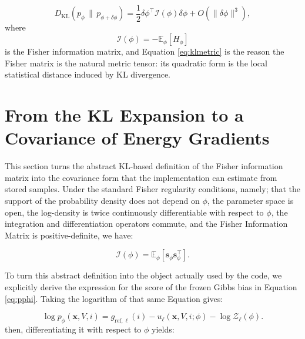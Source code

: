 \begin{equation}
    D_{\mathrm{KL}}
    \left(
        p_\phi
        \,\|\, 
        p_{\phi + \delta \phi}
    \right)
    =
    \frac{1}{2}
    \delta \phi^\top
    \mathcal{I}(\phi)
    \delta \phi
    +
    O(\|\delta \phi\|^3),
    \label{eq:klmetric}
\end{equation}
%
where
%
\begin{equation}
    \mathcal{I}(\phi)
    =
    -
    \mathbb{E}_\phi[H_\phi]
    \label{eq:fimhessian}
\end{equation}
%
is the Fisher information matrix, and Equation \eqref{eq:klmetric} is the reason the Fisher matrix is the natural metric tensor: its quadratic form is the local statistical distance induced by KL divergence.

\section{From the KL Expansion to a Covariance of Energy Gradients}

This section turns the abstract KL-based definition of the Fisher information matrix into the covariance form that the implementation can estimate from stored samples. Under the standard Fisher regularity conditions, namely; that the support of the probability density does not depend on $\phi$, the parameter space is open, the log-density is twice continuously differentiable with respect to $\phi$, the integration and differentiation operators commute, and the Fisher Information Matrix is positive-definite, we have:

\begin{equation}
    \mathcal{I}(\phi)
    =
    \mathbb{E}_\phi
    \left[
        \mathbf{s}_\phi
        \mathbf{s}_\phi^\top
    \right].
    \label{eq:fimscore}
\end{equation}

To turn this abstract definition into the object actually used by the code, we explicitly derive the expression for the score of the frozen Gibbs bias in Equation \eqref{eq:pphi}. Taking the logarithm of that same Equation gives:

\begin{equation}
    \log p_\phi(\mathbf{x}, V, i)
    =
    g_{\mathrm{ref},\ell}(i)
    -
    u_\ell(\mathbf{x}, V, i; \phi)
    -
    \log \mathcal{Z}_\ell(\phi).
    \label{eq:logpphi}
\end{equation}
%
then, differentiating it with respect to $\phi$ yields:

